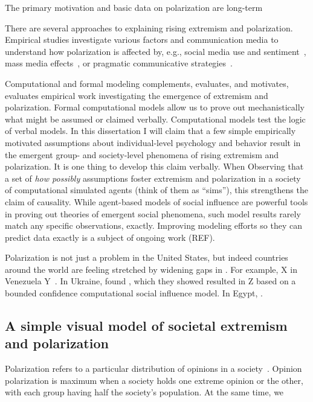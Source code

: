 \documentclass[12pt,letterpaper]{article}
\begin{document}
The primary motivation and basic data on polarization are long-term 


There are several approaches to explaining rising extremism and polarization.
Empirical studies investigate various factors and communication media to understand
how polarization is affected by, e.g., social media use and 
sentiment~\cite{Bail2018}, mass media effects~\cite{Prior2013,Pew2014,Martin2017a}, 
or pragmatic communicative 
strategies~\cite{Charteris-Black2009,Thibodeau2015,Flusberg2017,Flusberg2018,Turner2021a}.


Computational and formal modeling complements, evaluates, and motivates, evaluates 
empirical work investigating the emergence of extremism and polarization.
Formal computational models allow us to prove out mechanistically what might
be assumed or claimed verbally. Computational models test the logic of 
verbal models. In this dissertation I will claim that a few simple empirically
motivated assumptions about individual-level psychology and behavior result
in the emergent group- and society-level phenomena of rising extremism and
polarization. It is one thing to develop this claim verbally. When
Observing that a set of \emph{how possibly} assumptions foster extremism and
polarization in a society of computational simulated agents 
(think of them as ``sims''), this strengthens the claim of causality. While
agent-based models of social influence are powerful tools in proving out 
theories of emergent social phenomena, such model results rarely match any
specific observations, exactly. Improving modeling efforts so they can predict
data exactly is a subject of ongoing work (REF).

Polarization is not just a problem in the United States, but indeed countries
around the world are feeling stretched by widening gaps in . For example,
X in Venezuela Y~\cite{Morales2015}. In Ukraine,  found , 
which they showed resulted
in Z based on a bounded confidence computational social influence model. 
In Egypt, \cite{Borge-Holthoefer2014}.


\subsection{A simple visual model of societal extremism and polarization}

Polarization refers to a particular distribution of opinions in a 
society~\cite{Blau1974,Bramson2016,Turner2018}. Opinion polarization is maximum when
a society holds one extreme opinion or the other, with each group having half
the society's population. At the same time, we 
\end{document}

